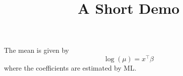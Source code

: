 \documentclass[article]{jss}
\title{A Short Demo}
\begin{document}
The mean is given by
%
\begin{equation} \label{eq:mean}
\log(\mu) = x^\top \beta
\end{equation}
%
where the coefficients are estimated by ML.
\end{document}
